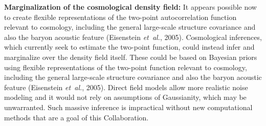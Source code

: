 \documentclass[12pt]{article}
\newcommand{\foreign}[1]{\textsl{#1}}
\newcommand{\etal}{\foreign{et~al.}}
\begin{document}


\textbf{Marginalization of the cosmological density field:} 
It appears possible now to create flexible representations of the
two-point autocorrelation function relevant to cosmology, including
the general large-scale structure covariance and also the baryon
acoustic feature (Eisenstein \etal, 2005).
Cosmological inferences, which currently seek to estimate the two-point 
function, could instead infer and marginalize over the density field itself.
These could be based on Bayesian priors using flexible representations of the
two-point function relevant to cosmology, including
the general large-scale structure covariance and also the baryon
acoustic feature (Eisenstein \etal, 2005).
Direct field models allow more realistic noise modeling and it would not rely
on assumptions of Gaussianity, which may be unwarranted.
Such massive inference is impractical without new computational methods
that are a goal of this Collaboration.



\end{document}
